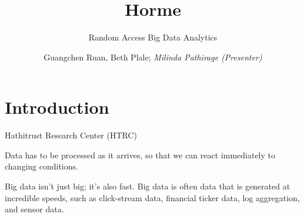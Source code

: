 \documentclass[newPxFont]{beamer}
\title{Horme}
\subtitle{Random Access Big Data Analytics}
\author{Guangchen Ruan, Beth Plale; \emph{Milinda Pathirage (Presenter)}}
\institute{School of Informatics and Computing, Indiana University}
\begin{document}

%
%

\maketitle


%
%

\section{Introduction}


\begin{frame}[c]{Hathitrust Research Center (HTRC)}

Data has to be processed as it arrives, so that we can react immediately to changing conditions. 

\vspace{1em}

\begin{exampleblock}{Big data isn't just big; it's also fast.}
Big data is often data that is generated at incredible speeds, such as click-stream data, financial ticker data, log aggregation, and sensor data. 
\end{exampleblock}


\end{frame}
\end{document}
